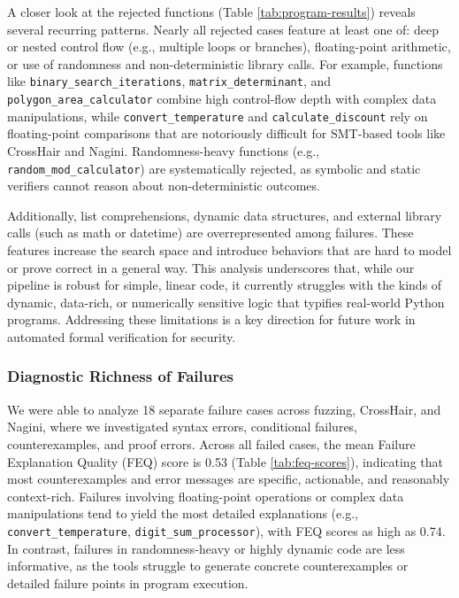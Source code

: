 A closer look at the rejected functions (Table \ref{tab:program-results}) reveals several recurring patterns. Nearly all rejected cases feature at least one of: deep or nested control flow (e.g., multiple loops or branches), floating-point arithmetic, or use of randomness and non-deterministic library calls. For example, functions like \texttt{binary\_search\_iterations}, \texttt{matrix\_determinant}, and \texttt{polygon\_area\_calculator} combine high control-flow depth with complex data manipulations, while \texttt{convert\_temperature} and \texttt{calculate\_discount} rely on floating-point comparisons that are notoriously difficult for SMT-based tools like CrossHair and Nagini. Randomness-heavy functions (e.g., \texttt{random\_mod\_calculator}) are systematically rejected, as symbolic and static verifiers cannot reason about non-deterministic outcomes. 

Additionally, list comprehensions, dynamic data structures, and external library calls (such as math or datetime) are overrepresented among failures. These features increase the search space and introduce behaviors that are hard to model or prove correct in a general way. This analysis underscores that, while our pipeline is robust for simple, linear code, it currently struggles with the kinds of dynamic, data-rich, or numerically sensitive logic that typifies real-world Python programs. Addressing these limitations is a key direction for future work in automated formal verification for security.

\subsubsection{Diagnostic Richness of Failures}

We were able to analyze 18 separate failure cases across fuzzing, CrossHair, and Nagini, where we investigated syntax errors, conditional failures, counterexamples, and proof errors. Across all failed cases, the mean Failure Explanation Quality (FEQ) score is 0.53 (Table \ref{tab:feq-scores}), indicating that most counterexamples and error messages are specific, actionable, and reasonably context-rich. Failures involving floating-point operations or complex data manipulations tend to yield the most detailed explanations (e.g., \texttt{convert\_temperature}, \texttt{digit\_sum\_processor}), with FEQ scores as high as 0.74. In contrast, failures in randomness-heavy or highly dynamic code are less informative, as the tools struggle to generate concrete counterexamples or detailed failure points in program execution.

